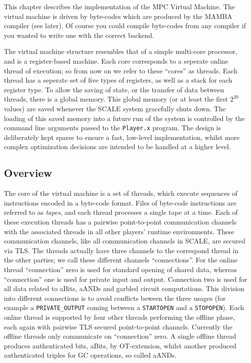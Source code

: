 
\label{sec:vm}

This chapter describes the implementation of the
MPC Virtual Machine.
The virtual machine is driven by byte-codes which
are produced by the MAMBA compiler (see later).
Of course you could compile byte-codes from any compiler
if you wanted to write one with the correct backend.

The virtual machine structure resembles that of a
simple multi-core processor, and is a register-based
machine.
Each core corresponds to a seperate online thread
of execution; so from now on we refer to these ``cores''
as threads.
Each thread has a seperate set of five types of registers, as
well as a stack for each register type.
To allow the saving of state, or the transfer of data
between threads, there is a global memory.
This global memory (or at least the first $2^{20}$
values) are saved whenever the SCALE system gracefully
shuts down.
The loading of this saved memory into a future run of the
system is controlled by the command line arguments
passed to the \verb+Player.x+ program.
The design is deliberately kept sparse to ensure a fast, low-level
implementation, whilst more complex optimization decisions are intended
to be handled at a higher level.

\subsection{Overview}

The core of the virtual machine is a set of threads, which
execute sequences of instructions encoded in a byte-code format.
Files of byte-code instructions are referred to as \emph{tapes},
and each thread processes a single tape at a time.
Each of these execution threads has a pairwise point-to-point
communication channels with the associated threads in all
other players' runtime environments.
These communication channels, like all communication channels
in SCALE, are secured via TLS.
The threads actually have three channels to the correspond
thread in the other parties; we call these different channels
``connections''.
For the online thread ``connection'' zero is used for standard
opening of shared data, whereas ``connection'' one is used for
private input and output.
Connection two is used for all data related to aBits, aANDs
and garbled circuit computations.
This division into different connections is to avoid conflicts beween
the three usages (for example a \verb+PRIVATE_OUTPUT+ coming between
a \verb+STARTOPEN+ and a \verb+STOPOPEN+).
Each online thread is supported by four other threads
performing the offline phase, each again with pairwise
TLS secured point-to-point channels. Currently the offline
threads only communicate on ``connection'' zero.
A single offline thread produces authenticated bits, aBits,
by OT-extension, whilst another produced authenticated
triples for GC operations, so called aANDs.

